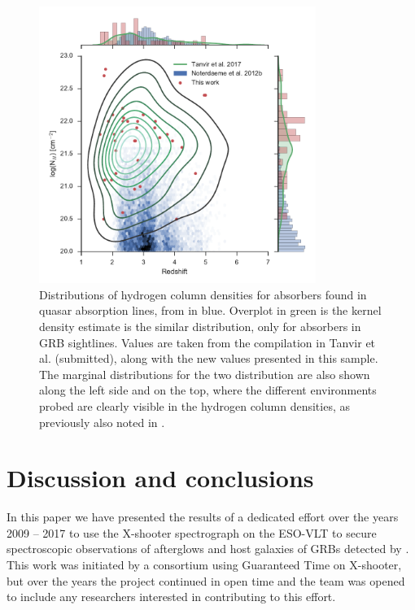 \documentclass{aa}    %
\begin{document}
\begin{figure}
	\centering \includegraphics[width=9cm]{figures/NH_dist.pdf}
\caption{Distributions of hydrogen column densities for absorbers found in
	quasar absorption lines, from \citep{Noterdaeme2012b} in blue. Overplot in
	green is the kernel density estimate is the similar distribution, only for
	absorbers in GRB sightlines. Values are taken from the compilation in Tanvir et
	al. (submitted), along with the new values presented in this sample. The
	marginal distributions for the two distribution are also shown along the left
	side and on the top, where the different environments probed are clearly
	visible in the hydrogen column densities, as previously also noted in
	\citet{Fynbo2009}.} \label{fig:NH_dist}
\end{figure}



\section{Discussion and conclusions}\label{conclusions}

In this paper we have presented the results of a dedicated effort over the years
2009 -- 2017 to use the X-shooter spectrograph on the ESO-VLT to secure
spectroscopic observations of afterglows and host galaxies of GRBs detected by
\swift. This work was initiated by a consortium using Guaranteed Time on
X-shooter, but over the years the project continued in open time and the team
was opened to include any researchers interested in contributing to this effort.
\end{document}
